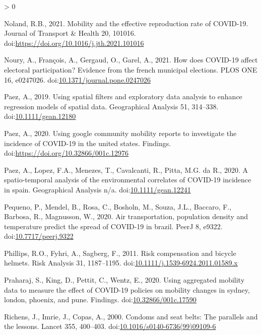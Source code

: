 \documentclass[]{elsarticle} %
\newlength{\cslhangindent}
\newenvironment{CSLReferences}[2] %
 {%
  \setlength{\parindent}{0pt}
  \ifodd #1 \everypar{\setlength{\hangindent}{\cslhangindent}}\ignorespaces\fi
  \ifnum #2 > 0
  \setlength{\parskip}{#2\baselineskip}
  \fi
 }%
 {}
\begin{document}
\begin{CSLReferences}{1}{0}
\leavevmode\hypertarget{ref-Noland2021mobility}{}%
Noland, R.B., 2021. Mobility and the effective reproduction rate of
COVID-19. Journal of Transport \& Health 20, 101016.
doi:\url{https://doi.org/10.1016/j.jth.2021.101016}

\leavevmode\hypertarget{ref-Noury2021how}{}%
Noury, A., François, A., Gergaud, O., Garel, A., 2021. How does COVID-19
affect electoral participation? Evidence from the french municipal
elections. PLOS ONE 16, e0247026.
doi:\href{https://doi.org/10.1371/journal.pone.0247026}{10.1371/journal.pone.0247026}

\leavevmode\hypertarget{ref-Paez2019using}{}%
Paez, A., 2019. Using spatial filters and exploratory data analysis to
enhance regression models of spatial data. Geographical Analysis 51,
314--338.
doi:\href{https://doi.org/10.1111/gean.12180}{10.1111/gean.12180}

\leavevmode\hypertarget{ref-Paez2020using}{}%
Paez, A., 2020. Using google community mobility reports to investigate
the incidence of COVID-19 in the united states. Findings.
doi:\url{https://doi.org/10.32866/001c.12976}

\leavevmode\hypertarget{ref-Paez2020spatio}{}%
Paez, A., Lopez, F.A., Menezes, T., Cavalcanti, R., Pitta, M.G. da R.,
2020. A spatio-temporal analysis of the environmental correlates of
COVID-19 incidence in spain. Geographical Analysis n/a.
doi:\href{https://doi.org/10.1111/gean.12241}{10.1111/gean.12241}

\leavevmode\hypertarget{ref-Pequeno2020air}{}%
Pequeno, P., Mendel, B., Rosa, C., Bosholn, M., Souza, J.L., Baccaro,
F., Barbosa, R., Magnusson, W., 2020. Air transportation, population
density and temperature predict the spread of COVID-19 in brazil. PeerJ
8, e9322.
doi:\href{https://doi.org/10.7717/peerj.9322}{10.7717/peerj.9322}

\leavevmode\hypertarget{ref-Phillips2011risk}{}%
Phillips, R.O., Fyhri, A., Sagberg, F., 2011. Risk compensation and
bicycle helmets. Risk Analysis 31, 1187--1195.
doi:\href{https://doi.org/10.1111/j.1539-6924.2011.01589.x}{10.1111/j.1539-6924.2011.01589.x}

\leavevmode\hypertarget{ref-Praharaj2020Using}{}%
Praharaj, S., King, D., Pettit, C., Wentz, E., 2020. Using aggregated
mobility data to measure the effect of COVID-19 policies on mobility
changes in sydney, london, phoenix, and pune. Findings.
doi:\href{https://doi.org/10.32866/001c.17590}{10.32866/001c.17590}

\leavevmode\hypertarget{ref-Richens2000condoms}{}%
Richens, J., Imrie, J., Copas, A., 2000. Condoms and seat belts: The
parallels and the lessons. Lancet 355, 400--403.
doi:\href{https://doi.org/10.1016/s0140-6736(99)09109-6}{10.1016/s0140-6736(99)09109-6}


\end{CSLReferences}
\end{document}
